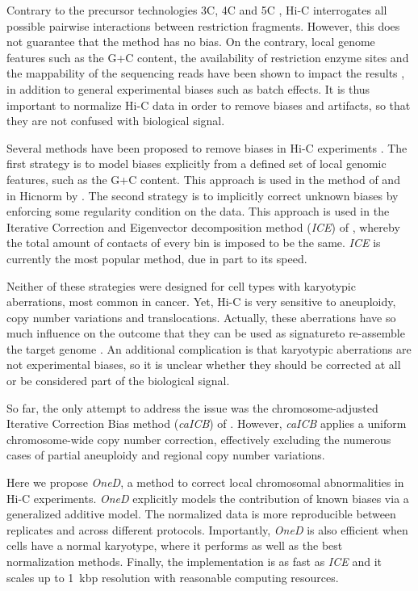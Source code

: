 \documentclass{article}
\begin{document}
Contrary to the precursor technologies 3C, 4C and 5C
\citep{dekker2002capturing, simonis2006nuclear,
dostie2006chromosome,de2012decade}, Hi-C interrogates all possible
pairwise interactions between restriction fragments. However, this does
not guarantee that the method has no bias.  On the contrary, local genome
features such as the G+C content, the availability of restriction enzyme
sites and the mappability of the sequencing reads have been shown to
impact the results \citep{yaffe2011probabilistic}, in addition to general
experimental biases such as batch effects. It is thus important to
normalize Hi-C data in order to remove biases and artifacts, so that they
are not confused with biological signal.

Several methods have been proposed to remove biases in Hi-C experiments
\citep{schmitt2016genome}. The first strategy is to model biases
explicitly from a defined set of local genomic features, such as the G+C
content. This approach is used in the method of
\cite{yaffe2011probabilistic} and in Hicnorm by \cite{hu2012hicnorm}. The
second strategy is to implicitly correct unknown biases by enforcing some
regularity condition on the data. This approach is used in the
Iterative Correction and Eigenvector decomposition method (\textit{ICE})
of \cite{imakaev2012iterative}, whereby the total amount of contacts of
every bin is imposed to be the same. \textit{ICE} is currently the most
popular method, due in part to its speed.

Neither of these strategies were designed for cell types with karyotypic
aberrations, most common in cancer. Yet, Hi-C is very sensitive to
aneuploidy, copy number variations and translocations.  Actually, these
aberrations have so much influence on the outcome that they can be used as
signatureto re-assemble the target genome \citep{korbel2013genome}. An
additional complication is that karyotypic aberrations are not
experimental biases, so it is unclear whether they should be corrected at
all or be considered part of the biological signal.

So far, the only attempt to address the issue was the chromosome-adjusted
Iterative Correction Bias method (\textit{caICB}) of
\cite{wu2016computational}. However, \textit{caICB} applies a uniform
chromosome-wide copy number correction, effectively excluding the numerous
cases of partial aneuploidy and regional copy number variations.

Here we propose \textit{OneD}, a method to correct local chromosomal
abnormalities in Hi-C experiments. \textit{OneD} explicitly models the
contribution of known biases via a generalized additive model. The
normalized data is more reproducible between replicates and across
different protocols. Importantly, \textit{OneD} is also efficient when
cells have a normal karyotype, where it performs as well as the best
normalization methods. Finally, the implementation is as fast as
\textit{ICE} and it scales up to 1~kbp resolution with reasonable
computing resources.
\end{document}
